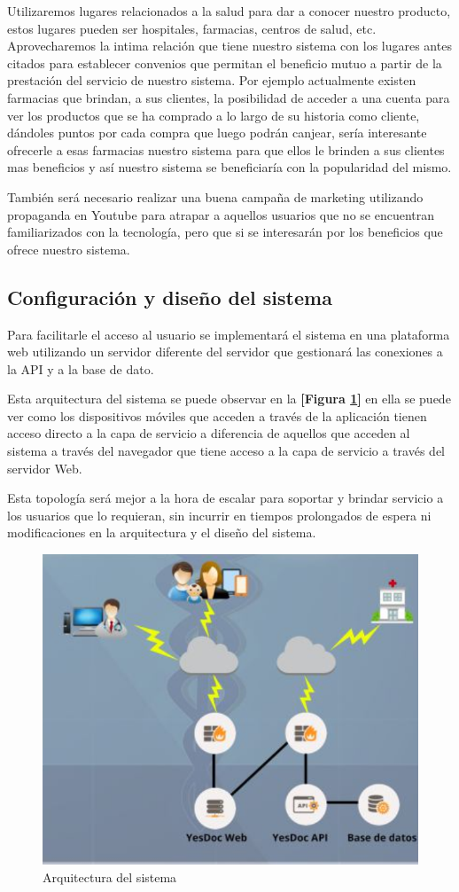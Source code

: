 Utilizaremos lugares relacionados a la salud para dar a conocer nuestro producto, estos lugares pueden ser hospitales, farmacias, centros de salud, etc. Aprovecharemos la intima relación que tiene nuestro sistema con los lugares antes citados para establecer  convenios que permitan el beneficio mutuo  a partir de la prestación del servicio de nuestro sistema. 
Por ejemplo actualmente existen farmacias que brindan, a sus clientes, la posibilidad  de acceder a una cuenta para ver  los productos que se ha comprado a lo largo de su historia como cliente, dándoles puntos por cada compra que luego podrán canjear, sería interesante ofrecerle a esas farmacias nuestro sistema para que ellos le brinden a sus clientes mas beneficios y así nuestro sistema se beneficiaría con la popularidad del mismo.

También será necesario realizar una buena campaña de marketing utilizando propaganda en Youtube para atrapar a aquellos usuarios que no se encuentran familiarizados con la tecnología, pero que si se interesarán por los beneficios que ofrece nuestro sistema.

\subsection{Configuración y diseño del sistema}
Para facilitarle el acceso al usuario se implementará el sistema en una plataforma web utilizando un servidor diferente del servidor que gestionará las conexiones a la  API y a la base de dato.

Esta arquitectura del sistema se puede observar en la \textbf{[Figura \ref{esq_funcionamiento}]} en ella se puede ver como los dispositivos móviles que acceden a través de la aplicación tienen acceso directo a la capa de servicio a diferencia de aquellos que acceden al sistema a través del navegador que tiene acceso a la capa de servicio a través del servidor Web.

Esta topología será mejor a la hora de escalar para soportar y brindar servicio a los usuarios que lo requieran, sin incurrir en tiempos prolongados de espera ni modificaciones en la arquitectura y el diseño del sistema.


 \begin{figure}
  \centering
  \includegraphics[width=.8\textwidth]{img/esq_funcionamiento}
  \caption{Arquitectura del sistema}
  \label{esq_funcionamiento}
\end{figure}


